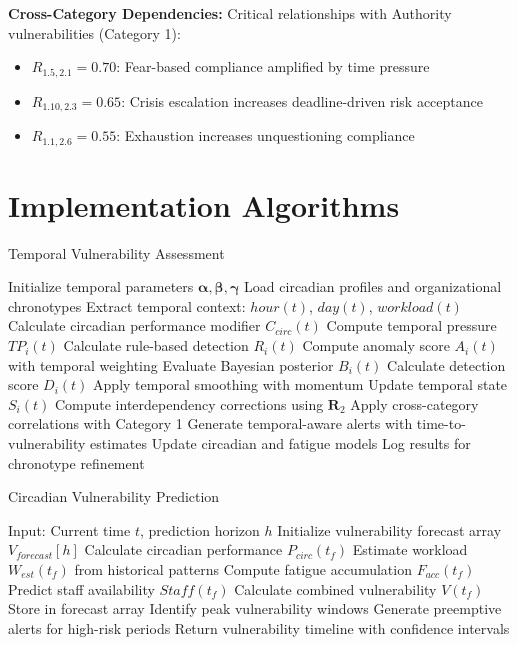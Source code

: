 \documentclass[11pt,a4paper]{article}
\begin{document}
\textbf{Cross-Category Dependencies:}
Critical relationships with Authority vulnerabilities (Category 1):
\begin{itemize}
\item $R_{1.5,2.1} = 0.70$: Fear-based compliance amplified by time pressure
\item $R_{1.10,2.3} = 0.65$: Crisis escalation increases deadline-driven risk acceptance
\item $R_{1.1,2.6} = 0.55$: Exhaustion increases unquestioning compliance
\end{itemize}

\section{Implementation Algorithms}

\begin{algorithm}
\caption{Temporal Vulnerability Assessment}
\begin{algorithmic}[1]
\STATE Initialize temporal parameters $\boldsymbol{\alpha}, \boldsymbol{\beta}, \boldsymbol{\gamma}$
\STATE Load circadian profiles and organizational chronotypes
    \STATE Extract temporal context: $hour(t)$, $day(t)$, $workload(t)$
    \STATE Calculate circadian performance modifier $C_{circ}(t)$
        \STATE Compute temporal pressure $TP_i(t)$
        \STATE Calculate rule-based detection $R_i(t)$
        \STATE Compute anomaly score $A_i(t)$ with temporal weighting
        \STATE Evaluate Bayesian posterior $B_i(t)$
        \STATE Calculate detection score $D_i(t)$
        \STATE Apply temporal smoothing with momentum
        \STATE Update temporal state $S_i(t)$
    \ENDFOR
    \STATE Compute interdependency corrections using $\mathbf{R}_2$
    \STATE Apply cross-category correlations with Category 1
    \STATE Generate temporal-aware alerts with time-to-vulnerability estimates
    \STATE Update circadian and fatigue models
    \STATE Log results for chronotype refinement
\ENDFOR
\end{algorithmic}
\end{algorithm}

\begin{algorithm}
\caption{Circadian Vulnerability Prediction}
\begin{algorithmic}[1]
\STATE Input: Current time $t$, prediction horizon $h$
\STATE Initialize vulnerability forecast array $V_{forecast}[h]$
    \STATE Calculate circadian performance $P_{circ}(t_f)$
    \STATE Estimate workload $W_{est}(t_f)$ from historical patterns
    \STATE Compute fatigue accumulation $F_{acc}(t_f)$
    \STATE Predict staff availability $Staff(t_f)$
    \STATE Calculate combined vulnerability $V(t_f)$
    \STATE Store in forecast array
\ENDFOR
\STATE Identify peak vulnerability windows
\STATE Generate preemptive alerts for high-risk periods
\STATE Return vulnerability timeline with confidence intervals
\end{algorithmic}
\end{algorithm}
\end{document}
